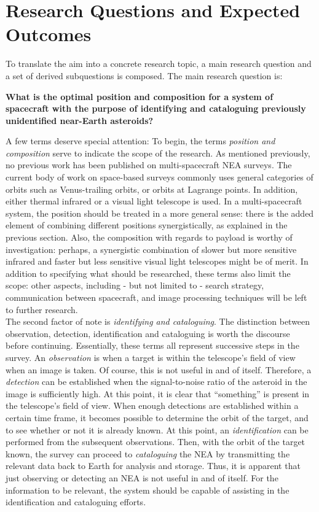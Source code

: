 \section{Research Questions and Expected Outcomes}
\label{sec:researchquestions}

To translate the aim into a concrete research topic, a main research question and a set of derived subquestions is composed. The main research question is:

\begin{center}\large\textbf{What is the optimal position and composition for a system of spacecraft with the purpose of identifying and cataloguing previously unidentified near-Earth asteroids?}\end{center}

A few terms deserve special attention: To begin, the terms \textit{position and composition} serve to indicate the scope of the research. As mentioned previously, no previous work has been published on multi-spacecraft NEA surveys. The current body of work on space-based surveys commonly uses general categories of orbits such as Venus-trailing orbits, or orbits at Lagrange points. In addition, either thermal infrared or a visual light telescope is used. In a multi-spacecraft system, the position should be treated in a more general sense: there is the added element of combining different positions synergistically, as explained in the previous section. Also, the composition with regards to payload is worthy of investigation: perhaps, a synergistic combination of slower but more sensitive infrared and faster but less sensitive visual light telescopes might be of merit. In addition to specifying what should be researched, these terms also limit the scope: other aspects, including - but not limited to - search strategy, communication between spacecraft, and image processing techniques will be left to further research. \\

The second factor of note is \textit{identifying and cataloguing}. The distinction between observation, detection, identification and cataloguing is worth the discourse before continuing. Essentially, these terms all represent successive steps in the survey. An \textit{observation} is when a target is within the telescope's field of view when an image is taken. Of course, this is not useful in and of itself. Therefore, a \textit{detection} can be established when the signal-to-noise ratio of the asteroid in the image is sufficiently high. At this point, it is clear that ``something'' is present in the telescope's field of view. When enough detections are established within a certain time frame, it becomes possible to determine the orbit of the target, and to see whether or not it is already known. At this point, an \textit{identification} can be performed from the subsequent observations. Then, with the orbit of the target known, the survey can proceed to \textit{cataloguing} the NEA by transmitting the relevant data back to Earth for analysis and storage. Thus, it is apparent that just observing or detecting an NEA is not useful in and of itself. For the information to be relevant, the system should be capable of assisting in the identification and cataloguing efforts. \\

